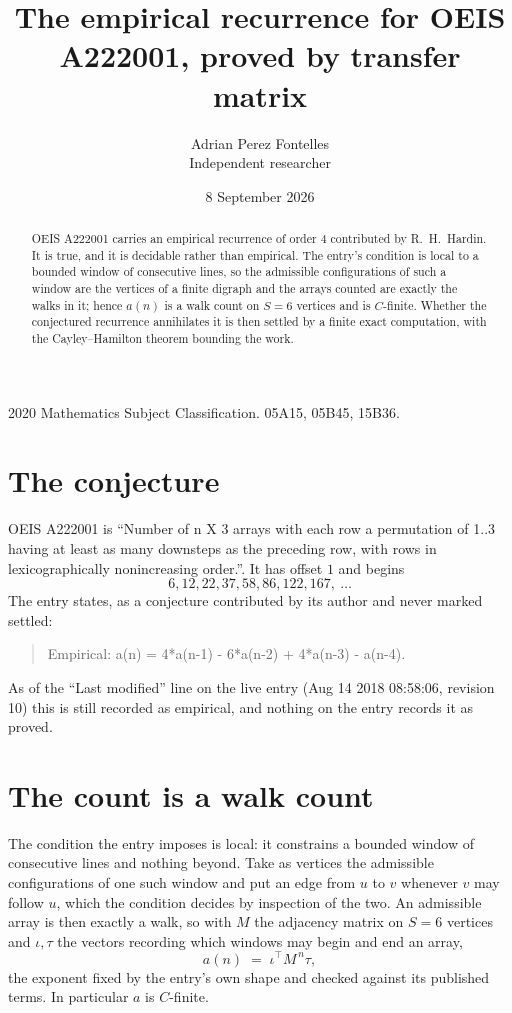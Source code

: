 \documentclass[11pt,a4paper]{article}
\title{The empirical recurrence for OEIS A222001, proved by transfer matrix}
\author{Adrian Perez Fontelles\\ \small Independent researcher}
\date{8 September 2026}
\theoremstyle{plain}
\theoremstyle{definition}
\begin{document}
\maketitle

\begin{abstract}
OEIS A222001 carries an empirical recurrence of order $4$ contributed by R.~H.~Hardin. It is
true, and it is decidable rather than empirical. The entry's condition is local to a bounded window of consecutive lines, so
the admissible configurations of such a window are the vertices of a finite digraph and the
arrays counted are exactly the walks in it; hence $a(n)$ is a walk count on $S=6$ vertices
and is $C$-finite. Whether the conjectured recurrence annihilates it is then settled by a
finite exact computation, with the Cayley--Hamilton theorem bounding the work.
\end{abstract}

\noindent\small 2020 Mathematics Subject Classification. 05A15, 05B45, 15B36.\normalsize

\section{The conjecture}

OEIS A222001 is ``Number of n X 3 arrays with each row a permutation of 1..3 having at least as many downsteps as the preceding row, with rows in lexicographically nonincreasing order.''. It has offset $1$ and begins
\[
6, 12, 22, 37, 58, 86, 122, 167,\ \dots
\]
The entry states, as a conjecture contributed by its author and never marked settled:
\begin{quote}
Empirical: a(n) = 4*a(n-1) - 6*a(n-2) + 4*a(n-3) - a(n-4).
\end{quote}
As of the ``Last modified'' line on the live entry (Aug 14 2018 08:58:06, revision 10) this is still
recorded as empirical, and nothing on the entry records it as proved.

\section{The count is a walk count}

The condition the entry imposes is local: it constrains a bounded window of consecutive lines and nothing beyond. Take as
vertices the admissible configurations of one such window and put an edge from $u$ to $v$
whenever $v$ may follow $u$, which the condition decides by inspection of the two. An
admissible array is then exactly a walk, so with $M$ the adjacency matrix on $S=6$ vertices
and $\iota,\tau$ the vectors recording which windows may begin and end an array,
\[
a(n)\;=\;\iota^{\!\top}M^{\,n}\tau ,
\]
the exponent fixed by the entry's own shape and checked against its published terms. In
particular $a$ is $C$-finite.
\end{document}
